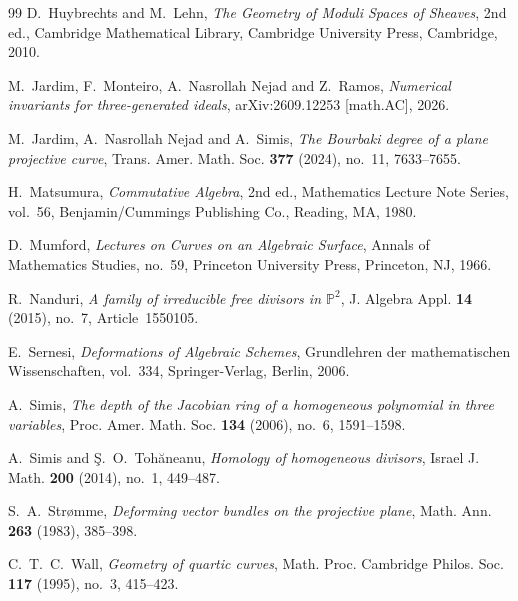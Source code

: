 \documentclass[11pt]{amsart} %
\theoremstyle{definition}
\def\NZQ{\mathbb}               %
\def\PP{{\NZQ P}}
\begin{document}
\begin{thebibliography}{99}
D.~Huybrechts and M.~Lehn,
\emph{The Geometry of Moduli Spaces of Sheaves},
2nd ed.,
Cambridge Mathematical Library,
Cambridge University Press, Cambridge, 2010.

M.~Jardim, F.~Monteiro, A.~Nasrollah Nejad and Z.~Ramos,
\emph{Numerical invariants for three-generated ideals},
arXiv:2609.12253 [math.AC], 2026.

M.~Jardim, A.~Nasrollah Nejad and A.~Simis,
\emph{The Bourbaki degree of a plane projective curve},
Trans. Amer. Math. Soc.
\textbf{377} (2024), no.~11, 7633--7655.

H.~Matsumura,
\emph{Commutative Algebra},
2nd ed.,
Mathematics Lecture Note Series, vol.~56,
Benjamin/Cummings Publishing Co., Reading, MA, 1980.

D.~Mumford,
\emph{Lectures on Curves on an Algebraic Surface},
Annals of Mathematics Studies, no.~59,
Princeton University Press, Princeton, NJ, 1966.

R.~Nanduri,
\emph{A family of irreducible free divisors in $\PP^2$},
J. Algebra Appl. \textbf{14} (2015), no.~7,
Article~1550105.

E.~Sernesi,
\emph{Deformations of Algebraic Schemes},
Grundlehren der mathematischen Wissenschaften, vol.~334,
Springer-Verlag, Berlin, 2006.

A.~Simis,
\emph{The depth of the Jacobian ring of a homogeneous polynomial
in three variables},
Proc. Amer. Math. Soc.
\textbf{134} (2006), no.~6, 1591--1598.

A.~Simis and {\c S}.~O.~Toh\u{a}neanu,
\emph{Homology of homogeneous divisors},
Israel J. Math.
\textbf{200} (2014), no.~1, 449--487.

S.~A.~Str{\o}mme,
\emph{Deforming vector bundles on the projective plane},
Math. Ann. \textbf{263} (1983), 385--398.

C.~T.~C.~Wall,
\emph{Geometry of quartic curves},
Math. Proc. Cambridge Philos. Soc.
\textbf{117} (1995), no.~3, 415--423.

\end{thebibliography}
\end{document}
